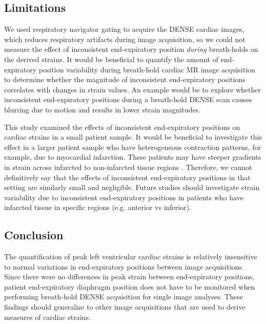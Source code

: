 \subsection{Limitations}
	We used respiratory navigator gating to acquire the DENSE cardiac images, which reduces respiratory artifacts during image acquisition, so we could not measure the effect of inconsistent end-expiratory position \textit{during} breath-holds on the derived strains. It would be beneficial to quantify the amount of end-expiratory position variability during breath-hold cardiac MR image acquisition to determine whether the magnitude of inconsistent end-expiratory positions correlates with changes in strain values. An example would be to explore whether inconsistent end-expiratory positions during a breath-hold DENSE scan causes blurring due to motion and results in lower strain magnitudes.
	
	This study examined the effects of inconsistent end-expiratory positions on cardiac strains in a small patient sample. It would be beneficial to investigate this effect in a larger patient sample who have heterogeneous contraction patterns, for example, due to myocardial infarction. These patients may have steeper gradients in strain across infarcted to non-infarcted tissue regions \cite{Pahlm2014}. Therefore, we cannot definitively say that the effects of inconsistent end-expiratory positions in that setting are similarly small and negligible. Future studies should investigate strain variability due to inconsistent end-expiratory positions in patients who have infarcted tissue in specific regions (e.g. anterior vs inferior).

\subsection{Conclusion}
	The quantification of peak left ventricular cardiac strains is relatively insensitive to normal variations in end-expiratory positions between image acquisitions. Since there were no differences in peak strain between end-expiratory positions, patient end-expiratory diaphragm position does not have to be monitored when performing breath-hold DENSE acquisition for single image analyses. These findings should generalize to other image acquisitions that are used to derive measures of cardiac strains.
	
	
	
